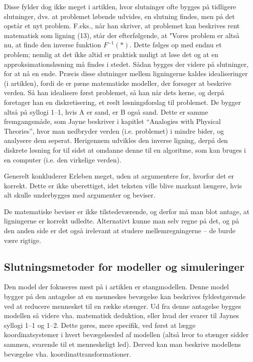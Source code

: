 \documentclass[10pt,a4paper]{article}
\begin{document}
Disse fylder dog ikke meget i artiklen, hvor slutninger ofte bygges på tidligere slutninger, dvs. at problemet løbende udvides, en slutning findes, men på det opstår et nyt problem. F.eks., når han skriver, at problemet kan beskrives rent matematisk som ligning (13), står der efterfølgende, at "Vores problem er altså nu, at finde den inverse funktion $F^{-1}(*)$. Dette følges op med endnu et problem; nemlig at det ikke altid er praktisk muligt at løse det og at en approksimationsløsning må findes i stedet. Sådan bygges der videre på slutninger, for at nå en ende. Præcis disse slutninger mellem ligningerne kaldes idealiseringer (i artiklen), fordi de er pæne matematiske modeller, der forsøger at beskrive verden. Så han idealisere først problemet, så han når dets kerne, og derpå foretager han en diskretisering, et reelt løsningsforslag til problemet. De bygger altså på syllogi 1--1, hvis A er sand, er B også sand.
Dette er samme fremgangsmåde, som Jayne beskriver i kapitlet ``Analogies with Physical Theories'', hvor man nedbryder verden (i.e. problemet) i mindre bider, og analysere dem seperat. Herigennem udvikles den inverse ligning, derpå den diskrete løsning for til sidst at omdanne denne til en algoritme, som kan bruges i en computer (i.e. den virkelige verden).

Generelt konkluderer Erleben meget, uden at argumentere for, hvorfor det er korrekt. Dette er ikke uberettiget, idet teksten ville blive markant længere, hvis alt skulle underbygges med argumenter og beviser.

De matematiske beviser er ikke tilstedeværende, og derfor må man blot antage, at ligningerne er korrekt udledte. Alternativt kunne man selv regne på det, og på den anden side er det også irelevant at studere mellemregningerne -- de burde være rigtige. 

\subsection{Slutningsmetoder for modeller og simuleringer}
Den model der fokuseres mest på i artiklen er stangmodellen. Denne model bygger på den antagelse at en menneskes bevægelse kan beskrives fyldestgørende ved at reducere mennesket til en række stænger. Ud fra denne antagelse bygges modellen så videre vha. matematisk deduktion, eller hvad der svarer til Jaynes syllogi 1--1 og 1--2. Dette gøres, mere specifik, ved først at lægge koordinatsystemer i hvert bevægelsesled af modellen (altså hvor to stænger sidder sammen, svarende til et menneskeligt led). Derved kan man beskrive modellens bevægelse vha. koordinattransformationer.
\end{document}
